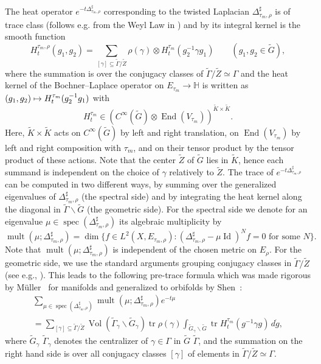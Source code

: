 \documentclass[10pt]{amsart}
\newcommand\mto{\mathchoice{\longmapsto}{\mapsto}{\mapsto}{\mapsto}}
\theoremstyle{plain}
\theoremstyle{definition}
\theoremstyle{remark}
\renewcommand{\H}{\mathbb{H}}
\DeclareMathOperator{\tr}{tr}
\DeclareMathOperator{\End}{End}
\DeclareMathOperator{\Vol}{Vol}
\DeclareMathOperator{\Id}{Id}
\DeclareMathOperator{\spec}{spec}
\numberwithin{equation}{section}
\DeclareMathOperator{\mult}{mult}
\begin{document}
The heat operator $e^{-t\Delta_{\tau_m,\rho}^\sharp}$ corresponding to the twisted Laplacian $\Delta_{\tau_m,\rho}^\sharp$ is of trace class (follows e.g. from the Weyl Law in \cite[Lem.\,2.2]{M1}) and by \cite[Eq.\,(5.6)]{M1} its integral kernel is the smooth function
\[
H_t^{\tau_m,\rho}(g_1,g_2) = \sum_{[\gamma]\subseteq\widetilde{\Gamma}/\widetilde{Z}} \rho(\gamma)\otimes H_t^{\tau_m}(g_2^{-1}\gamma g_1) \qquad (g_1,g_2\in\widetilde{G}),
\]
where the summation is over the conjugacy classes of $\widetilde{\Gamma}/\widetilde{Z}\simeq\Gamma$ and the heat kernel of the Bochner--Laplace operator on $E_{\tau_m}\to\H$ is written as $(g_1,g_2)\mto H_t^{\tau_m}(g_2^{-1}g_1)$ with
\[
H_t^{\tau_m}\in(C^\infty(\widetilde{G})\otimes\End(V_{\tau_m}))^{\widetilde{K}\times\widetilde{K}}.
\]
Here, $\widetilde{K}\times\widetilde{K}$ acts on $C^\infty(\widetilde{G})$ by left and right translation, on $\End(V_{\tau_m})$ by left and right composition with $\tau_m$, and on their tensor product by the tensor product of these actions. Note that the center $\widetilde Z$ of $\widetilde G$ lies in $\widetilde K$, hence each summand is independent on the choice of $\gamma$ relatively to $\widetilde Z$. The trace of $e^{-t\Delta_{\tau_m,\rho}^\sharp}$ can be computed in two different ways, by summing over the generalized eigenvalues of $\Delta_{\tau_m,\rho}^\sharp$ (the spectral side) and by integrating the heat kernel along the diagonal in $\widetilde{\Gamma}\backslash\widetilde{G}$ (the geometric side). For the spectral side we denote for an eigenvalue $\mu\in\spec(\Delta_{\tau_m,\rho}^\sharp)$ its algebraic multiplicity by
\[
\mult(\mu;\Delta_{\tau_m,\rho}^\sharp) = \dim\{f\in L^2(X,E_{\tau_m,\rho}):(\Delta_{\tau_m,\rho}^\sharp-\mu\Id)^Nf=0\mbox{ for some }N\}.
\]
Note that $\mult(\mu;\Delta_{\tau_m,\rho}^\sharp)$ is independent of the chosen metric on $E_\rho$. For the geometric side, we use the standard arguments grouping conjugacy classes in $\widetilde{\Gamma}/\widetilde{Z}$ (see e.g., \cite[\S 2]{Wa}). This leads to the following pre-trace formula which was made rigorous by Müller~\cite[Prop.\,5.1]{M1} for manifolds and generalized to orbifolds by Shen~\cite[Th.\,7.1]{Shen2020}:
\begin{multline}
\sum_{\mu\in\spec(\Delta_{\tau_m,\rho}^\sharp)}\mult(\mu;\Delta_{\tau_m,\rho}^\sharp)e^{-t\mu}\\[-10pt]
= \sum_{[\gamma]\subseteq\widetilde{\Gamma}/\widetilde{Z}}\Vol(\widetilde{\Gamma}_\gamma\backslash\widetilde{G}_\gamma)\tr{\rho(\gamma)}\int_{\widetilde{G}_\gamma\backslash\widetilde{G}}\tr H_t^{\tau_m}(g^{-1}\gamma g)\,d\dot{g},\label{eq:PreTrace}
\end{multline}
where $\widetilde{G}_\gamma$ \resp $\widetilde{\Gamma}_\gamma$ denotes the centralizer of $\gamma\in\Gamma$ in $\widetilde{G}$ \resp $\widetilde{\Gamma}$, and the summation on the right hand side is over all conjugacy classes $[\gamma]$ of elements in $\widetilde{\Gamma}/\widetilde{Z}\simeq\Gamma$.
\end{document}
